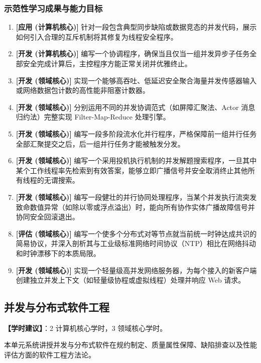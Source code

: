 \subsubsection{示范性学习成果与能力目标}
\begin{enumerate}
    \item \textbf{[应用 (计算机核心)]} 针对一段包含典型同步缺陷或数据竞态的并发代码，展示如何引入合理的互斥机制将其修复为线程安全程序。
    \item \textbf{[开发 (计算机核心)]} 编写一个协调程序，确保当且仅当一组并发异步子任务全部安全完成计算后，主控程序方能正常关闭并优雅终止。
    \item \textbf{[开发 (领域核心)]} 实现一个能够高吞吐、低延迟安全聚合海量并发传感器输入或网络数据包计数的高性能非阻塞计数器。
    \item \textbf{[开发 (领域核心)]} 分别运用不同的并发协调范式（如屏障汇聚法、Actor 消息归约法）完整实现 Filter-Map-Reduce 处理引擎。
    \item \textbf{[开发 (领域核心)]} 编写一段多阶段流水化并行程序，严格保障前一组并行任务全部汇聚提交之后，后一组并行任务才能被触发分发。
    \item \textbf{[开发 (领域核心)]} 编写一个采用投机执行机制的并发解题搜索程序，一旦其中某个工作线程率先检索到有效答案，能够立即广播信号并安全取消终止其他所有线程的无谓搜索。
    \item \textbf{[开发 (领域核心)]} 编写一段健壮的并行协同处理程序，当某个并发执行流突发致命数值异常（如除以零或浮点溢出）时，能向所有协作实体广播故障信号并协同安全回滚退出。
    \item \textbf{[评估 (领域核心)]} 编写一个使多个分布式对等节点就当前统一时钟达成共识的简易协议，并深入剖析其与工业级标准网络时间协议（NTP）相比在网络抖动和时钟漂移下的本质局限。
    \item \textbf{[开发 (领域核心)]} 实现一个轻量级高并发网络服务器，为每个接入的新客户端创建独立并发上下文（如轻量级协程或虚拟线程）处理并响应 Web 请求。
\end{enumerate}

\subsection{并发与分布式软件工程}
\textbf{【学时建议】}：2 计算机核心学时，3 领域核心学时。

本单元系统讲授并发与分布式软件在规约制定、质量属性保障、缺陷排查以及性能评估方面的软件工程方法论。

